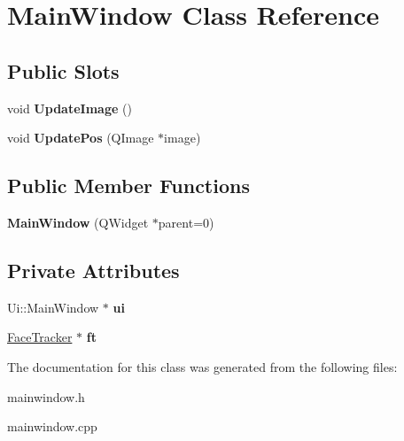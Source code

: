 \hypertarget{class_main_window}{\section{Main\-Window Class Reference}
\label{class_main_window}
}
\subsection*{Public Slots}
\begin{DoxyCompactItemize}
\item 
\hypertarget{class_main_window_a2e6410496a1c23ecb6efa35c5929602f}{void {\bfseries Update\-Image} ()}\label{class_main_window_a2e6410496a1c23ecb6efa35c5929602f}

\item 
\hypertarget{class_main_window_a07c9f1b8b561acfdf17cc66eb4364b61}{void {\bfseries Update\-Pos} (Q\-Image $\ast$image)}\label{class_main_window_a07c9f1b8b561acfdf17cc66eb4364b61}

\end{DoxyCompactItemize}
\subsection*{Public Member Functions}
\begin{DoxyCompactItemize}
\item 
\hypertarget{class_main_window_a8b244be8b7b7db1b08de2a2acb9409db}{{\bfseries Main\-Window} (Q\-Widget $\ast$parent=0)}\label{class_main_window_a8b244be8b7b7db1b08de2a2acb9409db}

\end{DoxyCompactItemize}
\subsection*{Private Attributes}
\begin{DoxyCompactItemize}
\item 
\hypertarget{class_main_window_a35466a70ed47252a0191168126a352a5}{Ui\-::\-Main\-Window $\ast$ {\bfseries ui}}\label{class_main_window_a35466a70ed47252a0191168126a352a5}

\item 
\hypertarget{class_main_window_a5b8fc1838f90e6decb989b3c3f723b90}{\hyperlink{class_face_tracker}{Face\-Tracker} $\ast$ {\bfseries ft}}\label{class_main_window_a5b8fc1838f90e6decb989b3c3f723b90}

\end{DoxyCompactItemize}


The documentation for this class was generated from the following files\-:\begin{DoxyCompactItemize}
\item 
mainwindow.\-h\item 
mainwindow.\-cpp\end{DoxyCompactItemize}

